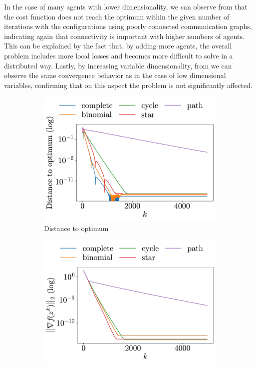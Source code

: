 \documentclass[a4paper,11pt,oneside]{book}
\begin{document}
In the case of many agents with lower dimensionality, we can observe from  that the cost function does not reach the optimum within the given number of iterations with the configurations using poorly connected communication graphs, indicating again that connectivity is important with higher numbers of agents. This can be explained by the fact that, by adding more agents, the overall problem includes more local losses and becomes more difficult to solve in a distributed way. Lastly, by increasing variable dimensionality, from  we can observe the same convergence behavior as in the case of low dimensional variables, confirming that on this aspect the problem is not significantly affected.


\begin{figure}[h!]
      \centering
      \begin{subfigure}[h]{0.42\linewidth}
            \centering
            \includegraphics[width=\linewidth]{./figs/quadratic/15_15/distance.pdf} 
            \caption{Distance to optimum}
      \end{subfigure}
      \hfill
      \begin{subfigure}[h]{0.42\linewidth}
            \centering
            \includegraphics[width=\linewidth]{./figs/quadratic/15_15/gradient.pdf} 

\end{subfigure}
\end{figure}
\end{document}

